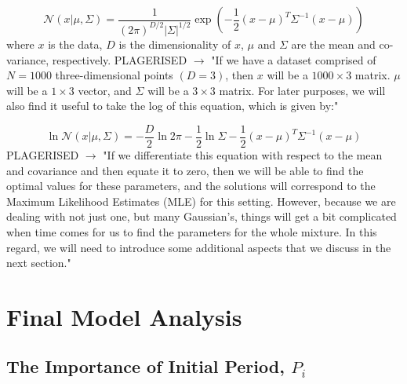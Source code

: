 \documentclass[fleqn,usenatbib]{mnras}
\begin{document}
\begin{equation}
    \label{eq:gaussian_density_function}
    \mathcal{N}(x|\mu,\Sigma) = \frac{1}{(2\pi)^{D/2}|\Sigma|^{1/2}} \exp \left(-\frac{1}{2}(x-\mu)^T\Sigma^{-1}(x-\mu)\right)
\end{equation}
where $x$ is the data, $D$ is the dimensionality of $x$, $\mu$ and $\Sigma$ are the mean and co-variance, respectively.
PLAGERISED $\longrightarrow$ "If we have a dataset comprised of $N = 1000$ three-dimensional points $(D = 3)$, then $x$ will be a $1000 \times 3$ matrix. $\mu$ will be a $1 \times 3$ vector, and $\Sigma$ will be a $3 \times 3$ matrix. For later purposes, we will also find it useful to take the log of this equation, which is given by:"

\begin{equation}
    \label{eq:log_gaussian_density_function}
    \ln\mathcal{N}(x|\mu,\Sigma) = -\frac{D}{2}\ln2\pi - \frac{1}{2}\ln\Sigma - \frac{1}{2}(x-\mu)^T\Sigma^{-1}(x-\mu)
\end{equation}
PLAGERISED $\longrightarrow$ "If we differentiate this equation with respect to the mean and covariance and then equate it to zero, then we will be able to find the optimal values for these parameters, and the solutions will correspond to the Maximum Likelihood Estimates (MLE) for this setting. However, because we are dealing with not just one, but many Gaussian's, things will get a bit complicated when time comes for us to find the parameters for the whole mixture. In this regard, we will need to introduce some additional aspects that we discuss in the next section."

\section{Final Model Analysis}
\subsubsection{}
\subsection{The Importance of Initial Period, $P_i$}






\end{document}
